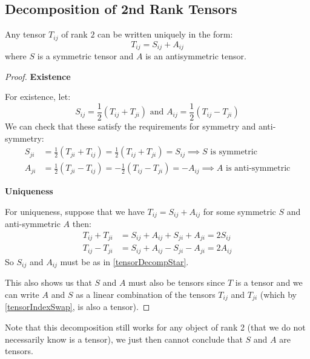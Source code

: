 \documentclass[../main.tex]{subfiles}
\begin{document}
\subsection{Decomposition of 2nd Rank Tensors}
\begin{proposition}
  Any tensor $T_{i j}$ of rank $2$ can be written uniquely in the form: \label{ASDecomp}
  \[
    T_{i j} = S_{i j} + A_{i j}
  \]
  where $S$ is a symmetric tensor and $A$ is an antisymmetric tensor.
\end{proposition}
\begin{proof}\par
  \textbf{Existence}\par
  For existence, let:
  \begin{equation}
    S_{i j} = \frac{1}{2}(T_{i j} + T_{j i}) \text{ and } A_{i j} = \frac{1}{2}(T_{i j} - T_{j i}) \label{tensorDecompStar} \tag{$\star$}
  \end{equation}
  We can check that these satisfy the requirements for symmetry and anti-symmetry:
  \begin{align*}
    S_{j i} &= \frac{1}{2}(T_{j i} + T_{i j}) = \frac{1}{2}(T_{i j} + T_{j i}) = S_{i j} \implies S \text{ is symmetric} \\
    A_{j i} &= \frac{1}{2}(T_{j i} - T_{i j}) = -\frac{1}{2}(T_{i j} - T_{j i}) = -A_{i j} \implies A \text{ is anti-symmetric}
  \end{align*}

  \textbf{Uniqueness}\par
  For uniqueness, suppose that we have $T_{i j} = S_{i j} + A_{i j}$ for some symmetric $S$ and anti-symmetric $A$ then:
  \begin{align*}
    T_{i j} + T_{j i} &= S_{i j} + A_{i j} + S_{j i} + A_{j i} = 2 S_{i j} \\
    T_{i j} - T_{j i} &= S_{i j} + A_{i j} - S_{j i} - A_{j i} = 2 A_{i j}
  \end{align*}
  So $S_{i j}$ and $A_{i j}$ must be as in \cref{tensorDecompStar}.

  This also shows us that $S$ and $A$ must also be tensors since $T$ is a tensor and we can write $A$ and $S$ as a linear combination of the tensors $T_{i j}$ and $T_{ji}$ (which by \cref{tensorIndexSwap}, is also a tensor).
\end{proof}
\begin{remark}
  Note that this decomposition still works for any object of rank 2 (that we do not necessarily know is a tensor), we just then cannot conclude that $S$ and $A$ are tensors.
\end{remark}
\end{document}
